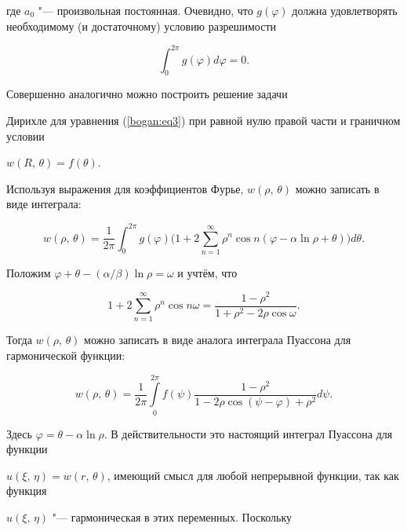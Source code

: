 где $a_0$ "--- произвольная постоянная. Очевидно, что $g(\varphi)$ должна удовлетворять необходимому (и достаточному) условию разрешимости

\[

 \int_0^{2\pi} g(\varphi)d\varphi=0.

\]



\smallskip



 Совершенно аналогично можно построить решение задачи

Дирихле для уравнения (\ref{bogan:eq3}) при равной нулю правой части и граничном условии

$w(R,\,\theta)= f(\theta).

$



Используя выражения для коэффициентов Фурье, $ w(\rho,\,\theta)$ можно записать в виде интеграла:

\[

 w(\rho, \,\theta)=\dfrac{1}{2 \pi}\int _0^{2 \pi} g(\varphi)\biggl(1+2 \sum_{n=1}^\infty

  \rho^n\cos n(\varphi-\alpha \ln \rho +\theta)\biggr) d\theta.

\]

Положим $\varphi +\theta -({\alpha}/{\beta}) \ln \rho= \omega$ и учтём, что

\[

1+2 \sum_{n=1}^\infty \rho^n \cos n \omega= \dfrac{1-\rho^2}{1+\rho^2 -2\rho \cos \omega}.

\]

Тогда $ w(\rho,\,\theta)$ можно записать  в виде аналога интеграла Пуассона для гармонической функции:

\begin{equation}

\label{bogan:eq14}

w(\rho,\,\theta)= \frac{1}{2 \pi}\int \limits_0^{2 \pi} f(\psi)\frac{1-\rho^2}{1-2\rho \cos(\psi-\varphi)+\rho^2}d\psi.

\end{equation}

Здесь $\varphi=\theta-\alpha \ln \rho $. В действительности это настоящий интеграл Пуассона для функции

$u(\xi,\,\eta)= w(r,\,\theta)$,  имеющий смысл для любой непрерывной функции, так как функция

$u(\xi,\,\eta)$ "--- гармоническая в этих переменных. Поскольку

